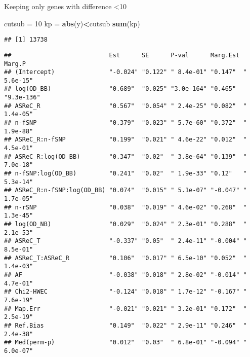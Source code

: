 \documentclass[]{article}
\newenvironment{Shaded}{\begin{snugshade}}{\end{snugshade}}
\newcommand{\KeywordTok}[1]{\textcolor[rgb]{0.13,0.29,0.53}{\textbf{#1}}}
\newcommand{\DecValTok}[1]{\textcolor[rgb]{0.00,0.00,0.81}{#1}}
\newcommand{\StringTok}[1]{\textcolor[rgb]{0.31,0.60,0.02}{#1}}
\newcommand{\OperatorTok}[1]{\textcolor[rgb]{0.81,0.36,0.00}{\textbf{#1}}}
\newcommand{\NormalTok}[1]{#1}
\begin{document}
Keeping only genes with difference \textless{}10

\begin{Shaded}
\begin{Highlighting}[]
\NormalTok{cutsub =}\StringTok{ }\DecValTok{10}
\NormalTok{kp =}\StringTok{ }\KeywordTok{abs}\NormalTok{(y)}\OperatorTok{<}\NormalTok{cutsub}
\KeywordTok{sum}\NormalTok{(kp)}
\end{Highlighting}
\end{Shaded}

\begin{verbatim}
## [1] 13738
\end{verbatim}

\begin{Shaded}
\end{Shaded}

\begin{verbatim}
##                           Est      SE      P-val      Marg.Est Marg.P    
## (Intercept)               "-0.024" "0.122" " 8.4e-01" "0.147"  " 5.6e-15"
## log(OD_BB)                "0.689"  "0.025" "3.0e-164" "0.465"  "9.3e-136"
## ASReC_R                   "0.567"  "0.054" " 2.4e-25" "0.082"  " 1.4e-05"
## n-fSNP                    "0.379"  "0.023" " 5.7e-60" "0.372"  " 1.9e-88"
## ASReC_R:n-fSNP            "0.199"  "0.021" " 4.6e-22" "0.012"  " 4.5e-01"
## ASReC_R:log(OD_BB)        "0.347"  "0.02"  " 3.8e-64" "0.139"  " 7.0e-18"
## n-fSNP:log(OD_BB)         "0.241"  "0.02"  " 1.9e-33" "0.12"   " 5.3e-14"
## ASReC_R:n-fSNP:log(OD_BB) "0.074"  "0.015" " 5.1e-07" "-0.047" " 1.7e-05"
## n-rSNP                    "0.038"  "0.019" " 4.6e-02" "0.268"  " 1.3e-45"
## log(OD_NB)                "0.029"  "0.024" " 2.3e-01" "0.288"  " 2.1e-53"
## ASReC_T                   "-0.337" "0.05"  " 2.4e-11" "-0.004" " 8.5e-01"
## ASReC_T:ASReC_R           "0.106"  "0.017" " 6.5e-10" "0.052"  " 1.4e-03"
## AF                        "-0.038" "0.018" " 2.8e-02" "-0.014" " 4.7e-01"
## Chi2-HWEC                 "-0.124" "0.018" " 1.7e-12" "-0.167" " 7.6e-19"
## Map.Err                   "-0.021" "0.021" " 3.2e-01" "0.172"  " 2.5e-19"
## Ref.Bias                  "0.149"  "0.022" " 2.9e-11" "0.246"  " 2.4e-38"
## Med(perm-p)               "0.012"  "0.03"  " 6.8e-01" "-0.094" " 6.0e-07"
\end{verbatim}
\end{document}
